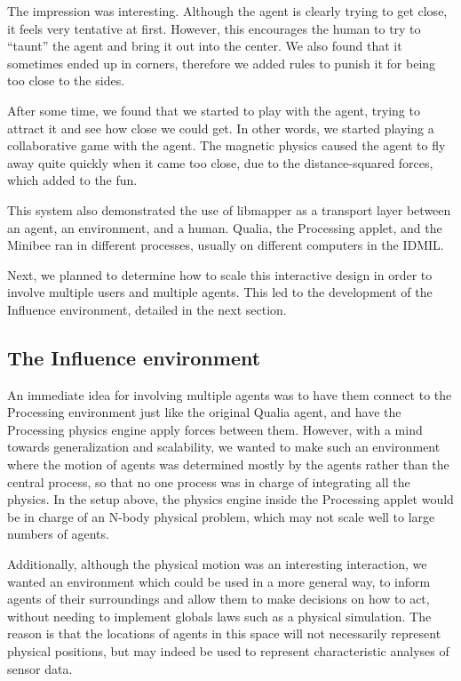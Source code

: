\documentclass{article}
\begin{document}
The impression was interesting.
Although the agent is clearly trying to get close, it feels very
tentative at first.
However, this encourages the human to try to ``taunt'' the agent and
bring it out into the center.
We also found that it sometimes ended up in corners, therefore we
added rules to punish it for being too close to the sides.

After some time, we found that we started to play with the agent,
trying to attract it and see how close we could get.
In other words, we started playing a collaborative game with the
agent.
The magnetic physics caused the agent to fly away quite quickly when
it came too close, due to the distance-squared forces, which added to
the fun.

This system also demonstrated the use of libmapper as a transport
layer between an agent, an environment, and a human.
Qualia, the Processing applet, and the Minibee ran in different
processes, usually on different computers in the IDMIL.

Next, we planned to determine how to scale this interactive design in
order to involve multiple users and multiple agents.
This led to the development of the Influence environment, detailed in
the next section.

\subsection{The Influence environment}

An immediate idea for involving multiple agents was to have them
connect to the Processing environment just like the original Qualia
agent, and have the Processing physics engine apply forces between
them.
However, with a mind towards generalization and scalability, we wanted
to make such an environment where the motion of agents was determined
mostly by the agents rather than the central process, so that no one
process was in charge of integrating all the physics.
In the setup above, the physics engine inside the Processing applet
would be in charge of an N-body physical problem, which may not scale
well to large numbers of agents.

Additionally, although the physical motion was an interesting
interaction, we wanted an environment which could be used in a more
general way, to inform agents of their surroundings and allow them to
make decisions on how to act, without needing to implement globals
laws such as a physical simulation.
The reason is that the locations of agents in this space will not
necessarily represent physical positions, but may indeed be used to
represent characteristic analyses of sensor data.
\end{document}

